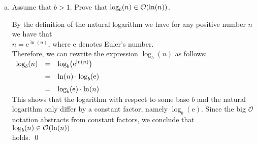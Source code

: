\exercise
\begin{enumerate}[(a)]
\item Assume that $b > 1$.  Prove that $\log_{b}(n) \in \mathcal{O}(\ln(n))$.

      \solution
      By the definition of the natural logarithm we have for any positive number $n$ we have that
      \\[0.2cm]
      \hspace*{1.3cm}
      $n = \mathrm{e}^{\ln(n)}$, \quad where \href{http://en.wikipedia.org/wiki/E_(mathematical_constant)}{$\mathrm{e}$} denotes Euler's number.
      \\[0.2cm]
      Therefore, we can rewrite the expression $\log_b(n)$
      as follows:
      \\[0.2cm]
      \hspace*{1.3cm}
      $
      \begin{array}[t]{lcl}
        \log_b(n) & = & \log_b\bigl(\mathrm{e}^{\ln(n)}\bigr) \\[0.2cm]
                  & = & \ln(n) \cdot \log_b(\mathrm{e})      \\[0.2cm]
                  & = & \log_b(\mathrm{e}) \cdot \ln(n)
      \end{array}
      $
      \\[0.2cm]
      This shows that the logarithm with respect to some base $b$ and the natural logarithm 
      only differ by a constant factor, namely $\log_b(\mathrm{e})$.  Since the big $\mathcal{O}$ notation abstracts from
      constant factors, we conclude that
      \\[0.2cm]
      \hspace*{1.3cm}
      $\log_{b}(n) \in \mathcal{O}(\ln(n))$
      \\[0.2cm]
      holds. \qed


\end{enumerate}
